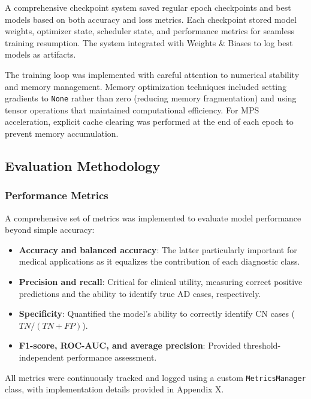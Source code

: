 \documentclass[11pt, a4paper]{article}
\begin{document}
A comprehensive checkpoint system saved regular epoch checkpoints and best models based on both accuracy and loss metrics. Each checkpoint stored model weights, optimizer state, scheduler state, and performance metrics for seamless training resumption. The system integrated with Weights \& Biases to log best models as artifacts.

The training loop was implemented with careful attention to numerical stability and memory management. Memory optimization techniques included setting gradients to \texttt{None} rather than zero (reducing memory fragmentation) and using tensor operations that maintained computational efficiency. For MPS acceleration, explicit cache clearing was performed at the end of each epoch to prevent memory accumulation.

\subsection{Evaluation Methodology}

\subsubsection{Performance Metrics}

A comprehensive set of metrics was implemented to evaluate model performance beyond simple accuracy:

\begin{itemize}
    \item \textbf{Accuracy and balanced accuracy}: The latter particularly important for medical applications as it equalizes the contribution of each diagnostic class.
    
    \item \textbf{Precision and recall}: Critical for clinical utility, measuring correct positive predictions and the ability to identify true AD cases, respectively.
    
    \item \textbf{Specificity}: Quantified the model's ability to correctly identify CN cases ($TN/(TN+FP)$).
    
    \item \textbf{F1-score, ROC-AUC, and average precision}: Provided threshold-independent performance assessment.
\end{itemize}

All metrics were continuously tracked and logged using a custom \texttt{MetricsManager} class, with implementation details provided in Appendix X.
\end{document}
